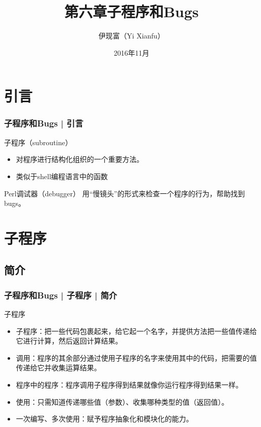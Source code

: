 


\title[子程序和Bugs]{第六章\quad 子程序和Bugs}
\author[Yixf]{伊现富（Yi Xianfu）}
\date{2016年11月}




\section{引言}
\begin{frame}
  \frametitle{子程序和Bugs | 引言}
  \begin{block}{子程序（subroutine）}
    \begin{itemize}
      \item 对程序进行结构化组织的一个重要方法。
      \item 类似于shell编程语言中的函数
    \end{itemize}
  \end{block}
  \pause
  \begin{block}{Perl调试器（debugger）}
    用“慢镜头”的形式来检查一个程序的行为，帮助找到bugs。
  \end{block}
\end{frame}

\section{子程序}
\subsection{简介}
\begin{frame}
  \frametitle{子程序和Bugs | 子程序 | 简介}
  \begin{block}{子程序}
    \begin{itemize}
      \item 子程序：把一些代码包裹起来，给它起一个名字，并提供方法把一些值传递给它进行计算，然后返回计算结果。
      \item 调用：程序的其余部分通过使用子程序的名字来使用其中的代码，把需要的值传递给它并收集运算结果。
      \item 程序中的程序：程序调用子程序得到结果就像你运行程序得到结果一样。
      \item 使用：只需知道传递哪些值（参数）、收集哪种类型的值（返回值）。
      \item 一次编写、多次使用：赋予程序抽象化和模块化的能力。
    \end{itemize}
  \end{block}
\end{frame}

